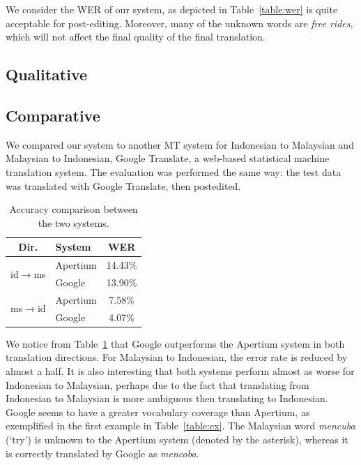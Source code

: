 \documentclass[10pt,a5paper,twoside]{article}
\begin{document}
We consider the WER of our system, as depicted in Table~\ref{table:wer} is quite acceptable for post-editing. Moreover, many of the unknown words are \emph{free rides}, which will not affect the final quality of the final translation.

\subsection{Qualitative}

\subsection{Comparative}
We compared our system to another MT system for Indonesian to Malaysian and Malaysian to Indonesian, Google Translate, a web-based statistical machine translation system. The evaluation was performed the same way: the test data was translated with Google Translate, then postedited.

\begin{table}[htbp]
  \begin{center}
  \begin{tabular}{clc}
  \toprule
  \bf{Dir.}                 & \bf{System}         & \bf{WER}  \\
  \midrule
  \multirow{2}{*}{id$\rightarrow$ms} & \small{Apertium} & 14.43\% \\
                                     & \small{Google} & 13.90\% \\
  \midrule
  \multirow{2}{*}{ms$\rightarrow$id} & \small{Apertium} & 7.58\% \\
                                     & \small{Google} & 4.07\% \\
  \bottomrule
  \end{tabular}
    \caption{Accuracy comparison between the two systems.}
    \label{table:comp}
  \end{center}
\end{table}

We notice from Table~\ref{table:comp} that Google outperforms the Apertium system in both translation directions. For Malaysian to Indonesian, the error rate is reduced by almost a half. It is also interesting that both systems perform almost as worse for Indonesian to Malaysian, perhaps due to the fact that translating from Indonesian to Malaysian is more ambiguous then translating to Indonesian. Google seems to have a greater vocabulary coverage than Apertium, as exemplified in the first example in Table~\ref{table:ex}. The Malaysian word \emph{mencuba} (`try') is unknown to the Apertium system (denoted by the asterisk), whereas it is correctly translated by Google as \emph{mencoba}.
\end{document}
